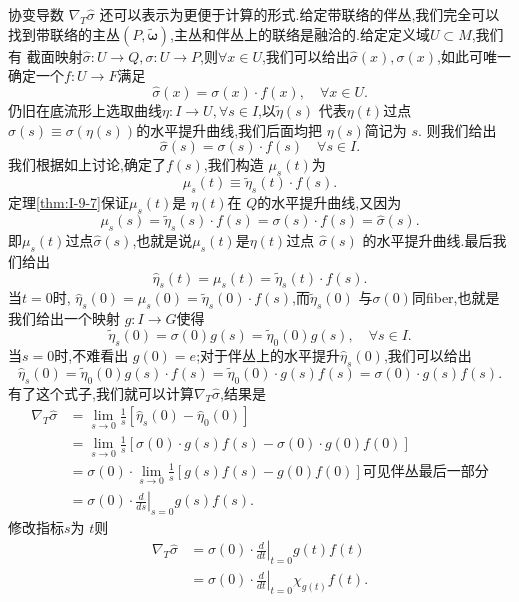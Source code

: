 \documentclass[../main.tex]{subfiles}
\begin{document}
协变导数 $\nabla_T \hat{\sigma}$ 还可以表示为更便于计算的形式.给定带联络的伴丛,我们完全可以找到带联络的主丛$(P,\bm{\tilde{\omega}})$,主丛和伴丛上的联络是融洽的.给定定义域$U \subset M$,我们有
截面映射$\hat{\sigma}: U\to Q,\sigma:U \to P$,则$\forall x \in U$,我们可以给出$\hat{\sigma}(x),\sigma(x)$,如此可唯一确定一个$f: U\to F$满足\[
\hat{\sigma}(x) = \sigma(x) \cdot f(x), \quad \forall x \in U 
.\] 
仍旧在底流形上选取曲线$\eta : I\to U, \forall s \in I$,以$\tilde{\eta}(s)$ 代表$\eta(t)$过点 $\sigma(s) \equiv \sigma(\eta(s))$的水平提升曲线,我们后面均把 $\eta(s)$简记为 $s$.
则我们给出\[
\hat{\sigma}(s) = \sigma(s) \cdot f(s) \quad \forall s \in I 
.\] 
我们根据如上讨论,确定了$f(s)$,我们构造 $\mu_s(t)$为 \[
\mu_s(t) \equiv \tilde{\eta}_s(t) \cdot f(s) 
.\] 
定理\ref{thm:I-9-7}保证$\mu_s(t)$是 $\eta(t)$在 $Q$的水平提升曲线,又因为 \[
\mu_s(s) = \tilde{\eta}_s(s) \cdot f(s) = \sigma(s) \cdot f(s) = \hat{\sigma}(s) 
.\] 
即$\mu_s(t)$过点$\hat{\sigma}(s)$,也就是说$\mu_s(t)$是$\eta(t)$过点 $\hat{\sigma}(s)$ 的水平提升曲线.最后我们给出\[
\hat{\eta}_s(t) = \mu_s(t) = \tilde{\eta}_s(t)\cdot f(s) 
.\] 
当$t = 0$时, $\hat{\eta}_s(0) = \mu_s(0) = \tilde{\eta}_s(0)\cdot f(s)$,而$\tilde{\eta}_s(0)$ 与$\sigma(0)$同fiber,也就是我们给出一个映射 $g : I\to G$使得\[
\tilde{\eta}_s(0) = \sigma(0) g(s) = \tilde{\eta}_0(0) g(s), \quad \forall s \in I 
.\] 
当$s = 0$时,不难看出 $g(0) = e$;对于伴丛上的水平提升$\hat{\eta}_s(0)$,我们可以给出\[
\hat{\eta}_s(0) = \tilde{\eta}_0(0) g(s) \cdot f(s) = \tilde{\eta}_0(0)\cdot g(s) f(s) = \sigma(0) \cdot g(s)f(s) 
.\] 
有了这个式子,我们就可以计算$\nabla_T \hat{\sigma}$,结果是
\begin{align*}
  \nabla_T \hat{\sigma} &= \lim_{s \to  0} \frac{1}{s}[\hat{\eta}_s(0) - \hat{\eta}_0(0)]  \\
                        & = \lim_{s \to  0} \frac{1}{s}[ \sigma(0) \cdot g(s) f(s) - \sigma(0) \cdot g(0)f(0)] \\
                        & = \sigma(0) \cdot \lim_{s\to 0} \frac{1}{s}[g(s)f(s) - g(0)f(0)]\text{可见伴丛最后一部分}\\
                        & = \sigma(0) \cdot \left.\frac{d}{ds}\right|_{s = 0}g(s)f(s) 
.\end{align*}
修改指标$s$为 $t$则 
\begin{align*}
  \nabla_T \hat{\sigma} &= \sigma(0) \cdot  \left.\frac{d}{dt}\right|_{t = 0}g(t)f(t) \\
                        & = \sigma(0) \cdot  \left.\frac{d}{dt}\right|_{t = 0} \chi_{g(t)} f(t)
.\end{align*}
\end{document}
